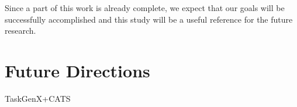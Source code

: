 Since a part of this work is already complete, we expect that our goals will be successfully accomplished and this study will be a useful reference for the future research.









\section{Future Directions}

TaskGenX+CATS